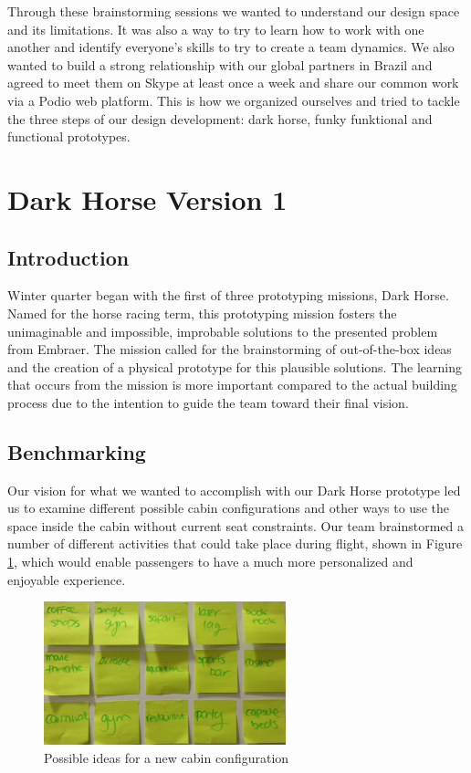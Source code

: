 Through these brainstorming sessions we wanted to understand our design space and its limitations. It was also a way to try to learn how to work with one another and identify everyone's skills to try to create a team dynamics. We also wanted to build a strong relationship with our global partners in Brazil and agreed to meet them on Skype at least once a week and share our common work via a Podio web platform. This is how we organized ourselves and tried to tackle the three steps of our design development: dark horse, funky funktional and functional prototypes. \\

\section{Dark Horse Version 1}
\subsection{Introduction}
Winter quarter began with the first of three prototyping missions, Dark Horse.  Named for the horse racing term, this prototyping mission fosters the unimaginable and impossible, improbable solutions to the presented problem from Embraer.  The mission called for the brainstorming of out-of-the-box ideas and the  creation of a physical prototype for this plausible solutions.  The learning that occurs from the mission is more important compared to the actual building process due to the intention to guide the team toward their final vision. \\

\subsection{Benchmarking}
Our vision for what we wanted to accomplish with our Dark Horse prototype led us to examine different possible cabin configurations and other ways to use the space inside the cabin without current seat constraints. Our team brainstormed a number of different activities that could take place during flight, shown in Figure \ref{fig:possible_themes.jpg}, which would enable passengers to have a much more personalized and enjoyable experience. 

\begin{figure}[h]
  \centering
     \includegraphics[width=7cm]{images/possible_themes.jpg}
   \caption{Possible ideas for a new cabin configuration}
  \label{fig:possible_themes.jpg}
\end{figure}

